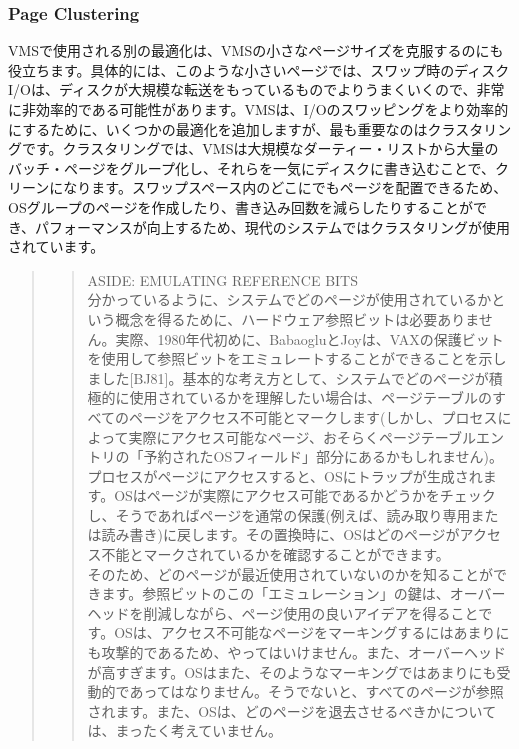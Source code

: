 \hypertarget{page-clustering}{%
\subsubsection*{Page Clustering}\label{page-clustering}}

VMSで使用される別の最適化は、VMSの小さなページサイズを克服するのにも役立ちます。具体的には、このような小さいページでは、スワップ時のディスクI/Oは、ディスクが大規模な転送をもっているものでよりうまくいくので、非常に非効率的である可能性があります。VMSは、I/Oのスワッピングをより効率的にするために、いくつかの最適化を追加しますが、最も重要なのはクラスタリングです。クラスタリングでは、VMSは大規模なダーティー・リストから大量のバッチ・ページをグループ化し、それらを一気にディスクに書き込むことで、クリーンになります。スワップスペース内のどこにでもページを配置できるため、OSグループのページを作成したり、書き込み回数を減らしたりすることができ、パフォーマンスが向上するため、現代のシステムではクラスタリングが使用されています。

\begin{quote}
\begin{quote}
ASIDE: EMULATING REFERENCE BITS\\
分かっているように、システムでどのページが使用されているかという概念を得るために、ハードウェア参照ビットは必要ありません。実際、1980年代初めに、BabaogluとJoyは、VAXの保護ビットを使用して参照ビットをエミュレートすることができることを示しました{[}BJ81{]}。基本的な考え方として、システムでどのページが積極的に使用されているかを理解したい場合は、ページテーブルのすべてのページをアクセス不可能とマークします(しかし、プロセスによって実際にアクセス可能なページ、おそらくページテーブルエントリの「予約されたOSフィールド」部分にあるかもしれません)。\\
プロセスがページにアクセスすると、OSにトラップが生成されます。OSはページが実際にアクセス可能であるかどうかをチェックし、そうであればページを通常の保護(例えば、読み取り専用または読み書き)に戻します。その置換時に、OSはどのページがアクセス不能とマークされているかを確認することができます。\\
そのため、どのページが最近使用されていないのかを知ることができます。参照ビットのこの「エミュレーション」の鍵は、オーバーヘッドを削減しながら、ページ使用の良いアイデアを得ることです。OSは、アクセス不可能なページをマーキングするにはあまりにも攻撃的であるため、やってはいけません。また、オーバーヘッドが高すぎます。OSはまた、そのようなマーキングではあまりにも受動的であってはなりません。そうでないと、すべてのページが参照されます。また、OSは、どのページを退去させるべきかについては、まったく考えていません。
\end{quote}
\end{quote}

